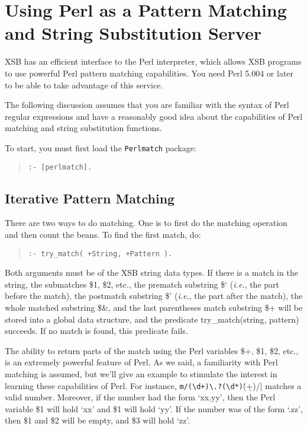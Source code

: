 \chapter{Using Perl as a Pattern Matching and String Substitution Server}

XSB has an efficient interface to the Perl interpreter, which allows XSB
programs to use powerful Perl pattern matching capabilities. You need Perl
5.004 or later to be able to take advantage of this service.

The following discussion assumes that you are familiar with the syntax of
Perl regular expressions and have a reasonably good idea about the
capabilities of Perl matching and string substitution functions.

To start, you must first load the {\tt Perlmatch}  package:

\begin{quote}
 {\tt  :- [perlmatch]. }
\end{quote}

\section{Iterative Pattern Matching}
There are two ways to do matching. One is to first do the matching
operation and then count the beans. To find the first match, do:

\begin{quote}
 {\tt   :- try\_match( +String, +Pattern ). }
\end{quote}

Both arguments must be of the XSB string data types.  If there is a match
in the string, the submatches {\$}1, {\$}2, etc., the prematch substring
{\$}` ({\it i.e.}, the part before the match), the postmatch substring
{\$}' ({\it i.e.}, the part after the match), the whole matched substring
{\$}{\&}, and the last parentheses match substring {\$}+ will be stored
into a global data structure, and the predicate try\_match(string, pattern)
succeeds. If no match is found, this predicate fails.

The ability to return parts of the match using the Perl variables {\$}+,
{\$}1, {\$}2, etc., is an extremely powerful feature of Perl.
As we said, a familiarity with Perl matching is assumed, but we'll give an
example to stimulate the interest in learning these capabilities of Perl.
For instance, \verb|m/(\d+)\.?(\d*)|\.(\d+)/| matches a valid
number. Moreover, if the number had the form `xx.yy', then the Perl variable
\$1 will hold `xx' and \$1 will hold `yy'. If the number was of the form
`.zz', then \$1 and \$2 will be empty, and \$3 will hold `zz'.

